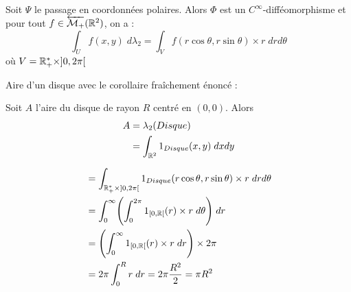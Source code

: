 \newpage
\begin{corollary}
    Soit $\Psi$ le passage en coordonnées polaires. Alors $\Phi$ est un $C^\infty$-difféomorphisme et 
    pour tout $f \in \overleftarrow{\mathcal{M}_+}(\mathbb{R}^2)$, on a :
        \[  \int_U f(x,y) \;d \lambda_2 = \int_V f(r \cos \theta, r \sin \theta) \times r \; dr d \theta \]
    où $V = \mathbb{R}_+^* \times ]0,2\pi[$
\end{corollary}

\begin{example}

    Aire d'un disque avec le corollaire fraîchement énoncé :

    \begin{minipage}{0.45\textwidth}
        Soit $A$ l'aire du disque de rayon $R$ centré en $(0,0)$.
        Alors
            \begin{align*}
                A &= \lambda_2(Disque) \\
                &= \int_{\mathbb{R}^2} 1_{Disque}(x,y) \; dxdy
            \end{align*}
    \end{minipage}
    \hfill 
    \begin{minipage}{0.45\textwidth}
        \begin{center}
        \end{center}
    \end{minipage}
    \begin{align*}
        &= \int_{\mathbb{R}_+^* \times ]0,2\pi[} 1_{Disque}(r \cos \theta, r \sin \theta) \times r \; dr d \theta \\
        &= \int_{0}^{\infty} \Biggl( \int_{0}^{2\pi} 1_{[0,\mathbb{R}[}(r) \times r \; d \theta \Biggr) \; dr \\
        &= \Biggl( \int_{0}^{\infty} 1_{[0,\mathbb{R}[}(r) \times r \; d r \Biggr) \times 2 \pi \\
        &= 2 \pi \int_{0}^{R} r \; dr = 2 \pi \frac{R^2}{2} = \pi R^2 
    \end{align*}
\end{example}


